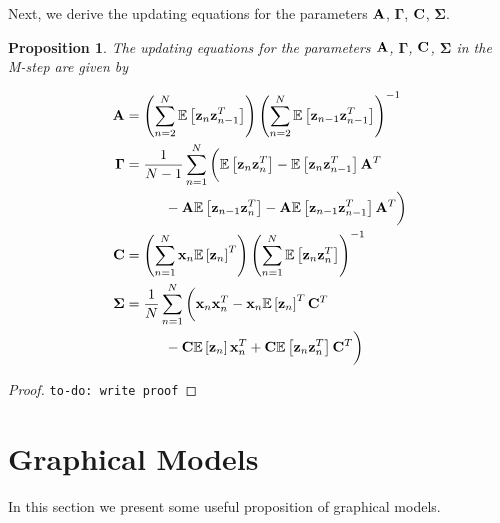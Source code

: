 \documentclass[11pt]{article}
\numberwithin{equation}{section}
\newcommand{\expectation}[1]{\mathbb{E}\left[#1\right]}
\newcommand{\x}{{\bf x}}
\newcommand{\z}{{\bf z}}
\newtheorem{proposition}{Proposition}[section]
\begin{document}
Next, we derive the updating equations for the parameters $\bf A$, $\boldsymbol{\Gamma}$, $\bf C$, $\boldsymbol{\Sigma}$.

\begin{proposition}
	The updating equations for the parameters $\bf A$, $\boldsymbol{\Gamma}$, $\bf C$, $\boldsymbol{\Sigma}$ in the M-step are given by
	
	\begin{align}
		{\bf A} &= \left(\sum_{n=2}^N \expectation{\z_n \z_{n-1}^T}\right)\left(\sum_{n=2}^N \expectation{\z_{n-1}\z_{n-1}^T}\right)^{-1} \\
		\boldsymbol{\Gamma} &= \frac{1}{N-1}\sum_{n=1}^N\bigg( \expectation{\z_n \z_n^T} - \expectation{\z_n \z_{n-1}^T}{\bf A}^T \nonumber\\
		&\hspace{1cm} - {\bf A}\expectation{\z_{n-1}\z_n^T} - {\bf A}\expectation{\z_{n-1} \z_{n-1}^T}{\bf A}^T \bigg) \\
		{\bf C} &= \left(\sum_{n=1}^N \x_n \expectation{\z_n}^T \right)\left(\sum_{n=1}^N \expectation{\z_n \z_n^T} \right)^{-1} \\
		\boldsymbol{\Sigma} &= \frac{1}{N}\sum_{n=1}^N\bigg(\x_n\x_n^T - \x_n \expectation{\z_n}^T {\bf C}^T \nonumber\\
		&\hspace{1cm} - {\bf C}\expectation{\z_n}\x_n^T + {\bf C} \expectation{\z_n \z_n^T}{\bf C}^T \bigg)
	\end{align}
\end{proposition}

\begin{proof}
	\texttt{to-do: write proof}
\end{proof}

\section{Graphical Models}
In this section we present some useful proposition of graphical models.
\end{document}
